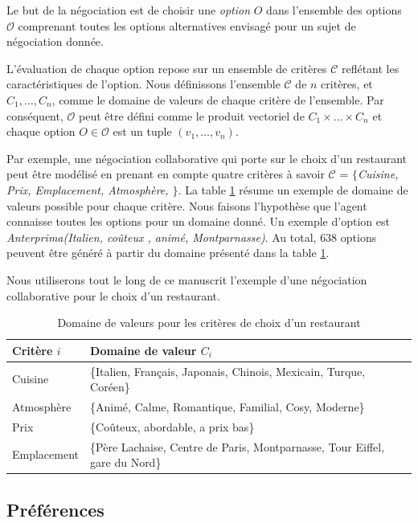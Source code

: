 		Le but de la négociation est de choisir une \textit{option} $O$ dans l'ensemble des options $\mathcal{O}$ comprenant toutes les options alternatives envisagé pour un sujet de négociation donnée. 
		
		L'évaluation de chaque option repose sur un ensemble de critères $\mathcal{C}$ reflétant les caractéristiques de l'option. Nous définissons l'ensemble $\mathcal{C}$ de $n$ critères, et $C_1,\ldots,C_n$, comme le domaine de valeurs de chaque critère de l'ensemble. 
		Par conséquent, $\mathcal{O}$ peut être défini comme le produit vectoriel de  $C_1\times\ldots\times C_n$ et chaque option $O \in \mathcal{O}$ est un tuple $(v_1,\ldots,v_n)$. 
		
		Par exemple, une négociation collaborative qui porte sur le choix d'un restaurant peut être modélisé en prenant en compte quatre critères à savoir $\mathcal{C}$ = \emph{$\{$Cuisine, Prix, Emplacement, Atmosphère, $\}$}. La table \ref{tab:domain} résume un exemple de domaine de valeurs possible pour chaque critère. Nous faisons l'hypothèse que l'agent connaisse toutes les options pour un domaine donné. Un exemple d'option est  \emph{Anterprima(Italien, coûteux , animé, Montparnasse)}. Au total, $638$ options peuvent être généré à partir du domaine présenté dans la table \ref{tab:domain}. 
		
		Nous utiliserons tout le long de ce manuscrit l'exemple d'une négociation collaborative pour le choix d'un restaurant. 
		\begin{table}[h]
			\centering
			\begin{tabular}{|p{2.25cm}|p{9.5cm}|}
				\hline
				Critère $i $ & Domaine de valeur $C_i$ \\
				\hline
				Cuisine & \{Italien, Français, Japonais, Chinois, Mexicain, Turque, Coréen\} \\
				\hline
				Atmosphère & \{Animé, Calme, Romantique, Familial, Cosy, Moderne\} \\
				\hline
				Prix & \{Coûteux, abordable, a prix bas\} \\
				\hline
				Emplacement & \{Père Lachaise, Centre de Paris, Montparnasse, Tour Eiffel, gare du Nord\} \\
				\hline
				
			\end{tabular}
			\caption{Domaine de valeurs pour les critères de choix d'un restaurant} 
			\label{tab:domain}
		\end{table}
		
		
		\subsection{Préférences}
		
